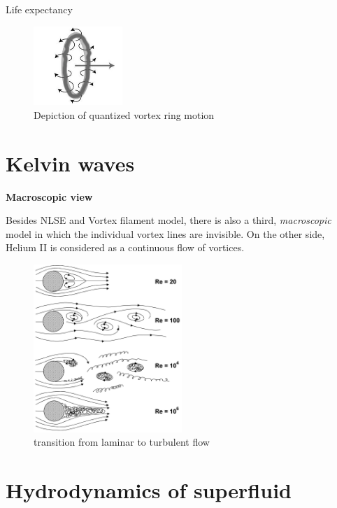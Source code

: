 \todo Life expectancy

\begin{figure}[h]
	\centering
	\includegraphics[width=0.3\textwidth]{graphics/theory/vortex-ring}
	\caption{Depiction of quantized vortex ring motion}
	\label{vortex-ring}
\end{figure}

\section{Kelvin waves}

\todo

\newpage

{\Huge \bfseries Macroscopic view}
\vspace{0.3cm}

Besides NLSE and Vortex filament model, there is also a third, \textit{macroscopic} model in which the individual vortex lines are invisible. On the other side, Helium II is considered as a continuous flow of vortices.

\begin{figure}[h]
	\centering
	\includegraphics[width=0.5\textwidth]{graphics/theory/laminar-turbulent}
	\caption{transition from laminar to turbulent flow}
	\label{laminar-turbulent}
\end{figure}

\section{Hydrodynamics of superfluid}

